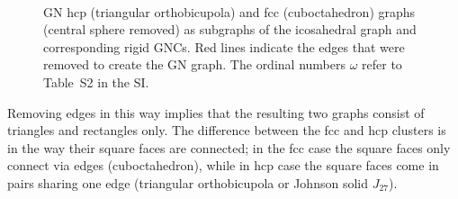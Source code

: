 \begin{figure}[htb]
    \centering
    \\
    \caption{GN hcp (triangular orthobicupola) and fcc (cuboctahedron) graphs
    (central sphere removed) as subgraphs of the icosahedral graph and
    corresponding rigid GNCs.  Red lines indicate the edges that were removed
    to create the GN graph. The ordinal numbers $\omega$ refer to Table~S2 in
    the SI.}
    \label{fig:GNshellgraphs}
\end{figure}
Removing edges in this way implies that the resulting two graphs consist of
triangles and rectangles only. The difference between the fcc and hcp clusters
is in the way their square faces are connected; in the fcc case the square
faces only connect via edges (cuboctahedron), while in hcp case the square
faces come in pairs sharing one edge (triangular orthobicupola or Johnson solid
$J_{27}$)\autocite{Kusner_ConfigurationSpacesEqual_2016}.

